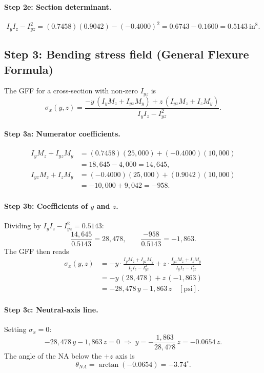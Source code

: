 \documentclass[11pt]{article}
\begin{document}
\paragraph{Step 2e: Section determinant.}
\[
I_y I_z - I_{yz}^2 = (0.7458)(0.9042) - (-0.4000)^2 = 0.6743 - 0.1600 = 0.5143\ \text{in}^8.
\]

\subsection*{Step 3: Bending stress field (General Flexure Formula)}

The GFF for a cross-section with non-zero $I_{yz}$ is
\[
\sigma_x(y,z) = \frac{-y\,(I_y M_z + I_{yz} M_y) + z\,(I_{yz} M_z + I_z M_y)}{I_y I_z - I_{yz}^2}.
\]

\paragraph{Step 3a: Numerator coefficients.}
\begin{align*}
I_y M_z + I_{yz} M_y &= (0.7458)(25{,}000) + (-0.4000)(10{,}000)\\
&= 18{,}645 - 4{,}000 = 14{,}645,\\[2pt]
I_{yz} M_z + I_z M_y &= (-0.4000)(25{,}000) + (0.9042)(10{,}000)\\
&= -10{,}000 + 9{,}042 = -958.
\end{align*}

\paragraph{Step 3b: Coefficients of $y$ and $z$.} Dividing by $I_y I_z - I_{yz}^2 = 0.5143$:
\[
\frac{14{,}645}{0.5143} = 28{,}478,\qquad \frac{-958}{0.5143} = -1{,}863.
\]
The GFF then reads
\begin{align*}
\sigma_x(y,z) &= -y\cdot\frac{I_y M_z + I_{yz} M_y}{I_y I_z - I_{yz}^2} + z\cdot\frac{I_{yz} M_z + I_z M_y}{I_y I_z - I_{yz}^2}\\
              &= -y\,(28{,}478) + z\,(-1{,}863)\\
              &= -28{,}478\,y - 1{,}863\,z\quad[\text{psi}].
\end{align*}

\paragraph{Step 3c: Neutral-axis line.} Setting $\sigma_x = 0$:
\[
-28{,}478\,y - 1{,}863\,z = 0 \;\Longrightarrow\; y = -\frac{1{,}863}{28{,}478}\,z = -0.0654\,z.
\]
The angle of the NA below the $+z$ axis is
\[
\theta_{NA} = \arctan(-0.0654) = -3.74^\circ.
\]
\end{document}
